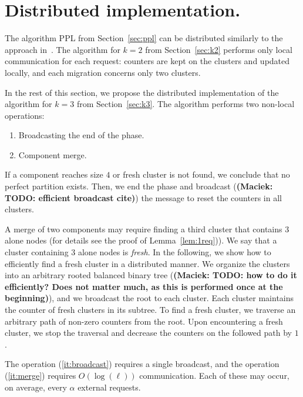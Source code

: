 \documentclass[manuscript,screen=true, review, anonymous]{acmart}
\newcommand\maciek[1]{\color{brown}\textbf{(Maciek: #1)}\color{black}}
\begin{document}
\section{Distributed implementation.}
The algorithm PPL from Section~\ref{sec:ppl} can be distributed
similarly to the approach in~\cite{sigmetrics19_partitioning}.
The algorithm for $k=2$ from Section~\ref{sec:k2} performs only local communication for each request: counters are kept on the clusters and updated locally, and each migration concerns only two clusters.
\medskip

In the rest of this section, we propose the distributed implementation of the algorithm for $k=3$ from Section~\ref{sec:k3}.
The algorithm performs two non-local operations:
\begin{enumerate}
	\item Broadcasting the end of the phase.\label{it:broadcast}
	\item Component merge.
	\label{it:merge}
\end{enumerate}

If a component reaches size $4$ or fresh cluster is not found, we conclude that no perfect partition exists.
Then, we end the phase and broadcast (\maciek{TODO: efficient broadcast cite}) the message to  reset the counters in all clusters.

A merge of two components may require finding a third cluster that contains $3$ alone nodes (for details see the proof of Lemma~\ref{lem:1req})).
We say that a cluster containing $3$ alone nodes is \emph{fresh}.
In the following, we show how to efficiently find a fresh cluster in a distributed manner.
We organize the clusters into an arbitrary rooted balanced binary tree (\maciek{TODO: how to do it efficiently? Does not matter much, as this is performed once at the beginning}), and we broadcast the root to each cluster.
Each cluster maintains the counter of fresh clusters in its subtree.
To find a fresh cluster, we traverse an arbitrary path of non-zero counters from the root.
Upon encountering a fresh cluster, we stop the traversal and decrease the counters on the followed path by $1$.

The operation (\ref{it:broadcast}) requires a single broadcast, and the operation (\ref{it:merge}) requires $O(\log(\ell))$ communication.
Each of these may occur, on average, every $\alpha$ external requests.



  

\appendix
\end{document}
